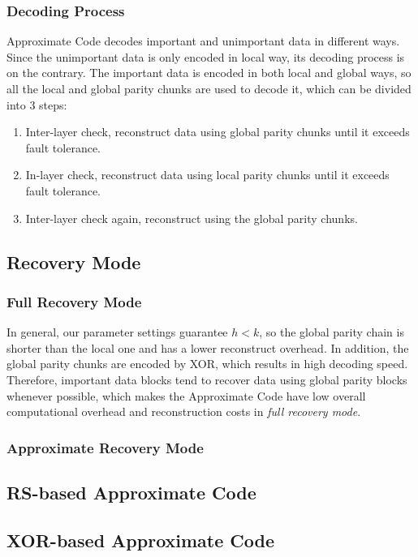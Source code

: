 \documentclass[sigconf]{acmart}
\begin{document}
\subsubsection{Decoding Process}
Approximate Code decodes important and unimportant data in different ways. Since the unimportant data is only encoded in local way, its decoding process is on the contrary.
The important data is encoded in both local and global ways, so all the local and global parity chunks are used to decode it, which can be divided into 3 steps:
\begin{enumerate}
\item Inter-layer check, reconstruct data using global parity chunks until it exceeds fault tolerance.
\item In-layer check, reconstruct data using local parity chunks until it exceeds fault tolerance.
\item Inter-layer check again, reconstruct using the global parity chunks.
\end{enumerate}

\subsection{Recovery Mode}

\subsubsection{Full Recovery Mode}
In general, our parameter settings guarantee $h<k$, so the global parity chain is shorter than the local one and has a lower reconstruct overhead.
In addition, the global parity chunks are encoded by XOR, which results in high decoding speed.
Therefore, important data blocks tend to recover data using global parity blocks whenever possible, which makes the Approximate Code have low overall computational overhead and reconstruction costs in \emph{full recovery mode}.

\subsubsection{Approximate Recovery Mode}



\subsection{RS-based Approximate Code}

\subsection{XOR-based Approximate Code}
\end{document}
